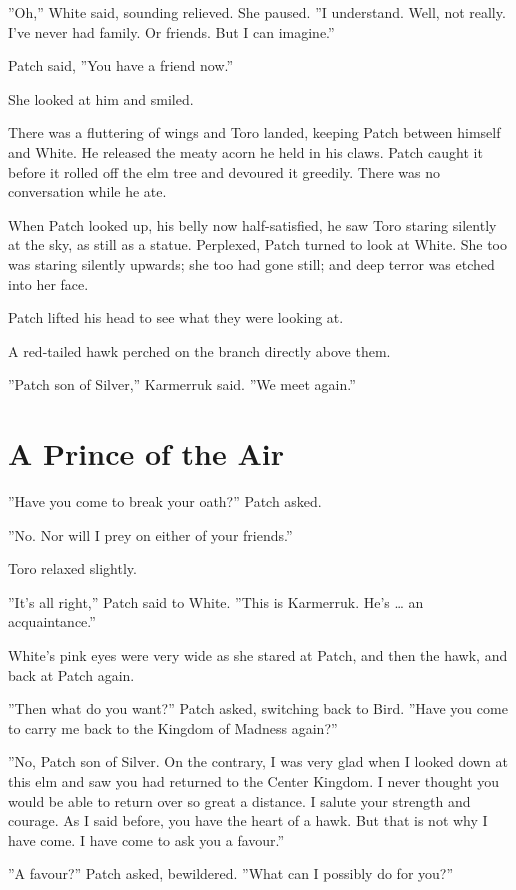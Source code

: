 \documentclass[12pt]{book}
\begin{document}
''Oh,'' White said, sounding relieved. She paused. ''I
understand. Well, not really. I've never had family. Or friends. But I
can imagine.''

Patch said, ''You have a friend now.''

She looked at him and smiled.

There was a fluttering of wings and Toro landed, keeping Patch between
himself and White. He released the meaty acorn he held in his
claws. Patch caught it before it rolled off the elm tree and devoured
it greedily. There was no conversation while he ate.

When Patch looked up, his belly now half-satisfied, he saw Toro
staring silently at the sky, as still as a statue. Perplexed, Patch
turned to look at White. She too was staring silently upwards; she too
had gone still; and deep terror was etched into her face.

Patch lifted his head to see what they were looking at.

A red-tailed hawk perched on the branch directly above them.

''Patch son of Silver,'' Karmerruk said. ''We meet again.''


\section{A Prince of the Air}

''Have you come to break your oath?'' Patch asked.

''No. Nor will I prey on either of your friends.''

Toro relaxed slightly.

''It's all right,'' Patch said to White. ''This is Karmerruk. He's
\ldots{} an acquaintance.''

White's pink eyes were very wide as she stared at Patch, and then the
hawk, and back at Patch again.

''Then what do you want?'' Patch asked, switching back to Bird. ''Have
you come to carry me back to the Kingdom of Madness again?''

''No, Patch son of Silver. On the contrary, I was very glad when I
looked down at this elm and saw you had returned to the Center
Kingdom. I never thought you would be able to return over so great a
distance. I salute your strength and courage. As I said before, you
have the heart of a hawk. But that is not why I have come. I have come
to ask you a favour.''

''A favour?'' Patch asked, bewildered. ''What can I possibly do for
you?''
\end{document}

